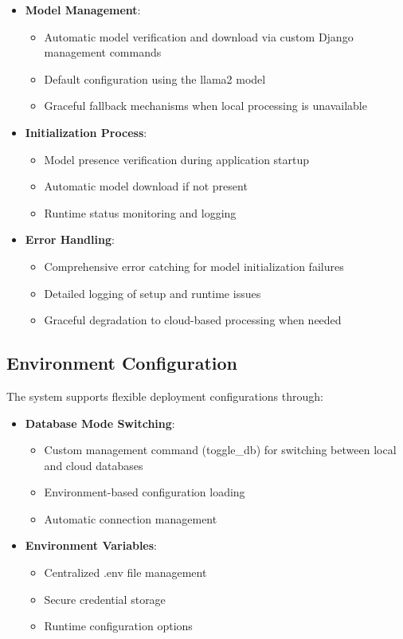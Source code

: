 \begin{itemize}
  \item \textbf{Model Management}:
    \begin{itemize}
      \item Automatic model verification and download via custom Django management commands
      \item Default configuration using the llama2 model
      \item Graceful fallback mechanisms when local processing is unavailable
    \end{itemize}
    
  \item \textbf{Initialization Process}:
    \begin{itemize}
      \item Model presence verification during application startup
      \item Automatic model download if not present
      \item Runtime status monitoring and logging
    \end{itemize}
    
  \item \textbf{Error Handling}:
    \begin{itemize}
      \item Comprehensive error catching for model initialization failures
      \item Detailed logging of setup and runtime issues
      \item Graceful degradation to cloud-based processing when needed
    \end{itemize}
\end{itemize}

\subsection{Environment Configuration}
The system supports flexible deployment configurations through:

\begin{itemize}
  \item \textbf{Database Mode Switching}:
    \begin{itemize}
      \item Custom management command (toggle\_db) for switching between local and cloud databases
      \item Environment-based configuration loading
      \item Automatic connection management
    \end{itemize}
    
  \item \textbf{Environment Variables}:
    \begin{itemize}
      \item Centralized .env file management
      \item Secure credential storage
      \item Runtime configuration options
    \end{itemize}
\end{itemize}

